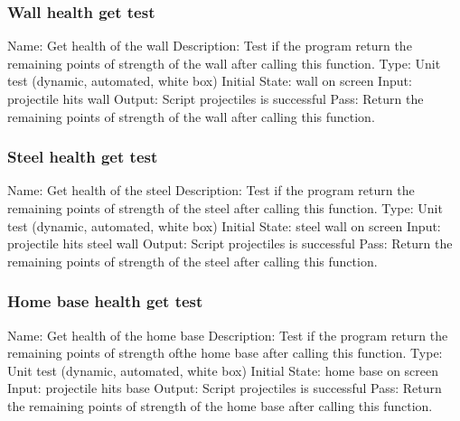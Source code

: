 \documentclass{article}
\begin{document}
\subsubsection{Wall health get test}
Name:  Get health of the wall\newline
Description: Test if the program return the remaining points of strength of 
the wall after calling this function. \newline
Type: Unit test (dynamic, automated, white box) \newline
Initial State:  wall on screen\newline
Input: projectile hits wall\newline
Output: Script projectiles is successful  \newline
Pass:  Return the remaining points of strength of the wall after calling this 
function. \newline

\subsubsection{Steel health get test}
Name:  Get health of the steel\newline
Description: Test if the program return the remaining points of strength of 
the steel after calling this function. \newline
Type: Unit test (dynamic, automated, white box) \newline
Initial State:  steel wall on screen\newline
Input: projectile hits steel wall\newline
Output: Script projectiles is successful  \newline
Pass:  Return the remaining points of strength of the steel after calling this 
function. \newline

\subsubsection{Home base health get test}
Name:  Get health of the home base\newline
Description: Test if the program return the remaining points of strength ofthe
 home base after calling this function. \newline
Type: Unit test (dynamic, automated, white box) \newline
Initial State:  home base on screen\newline
Input: projectile hits base\newline
Output: Script projectiles is successful  \newline
Pass:  Return the remaining points of strength of the home base after calling 
this function. \newline
\end{document}
